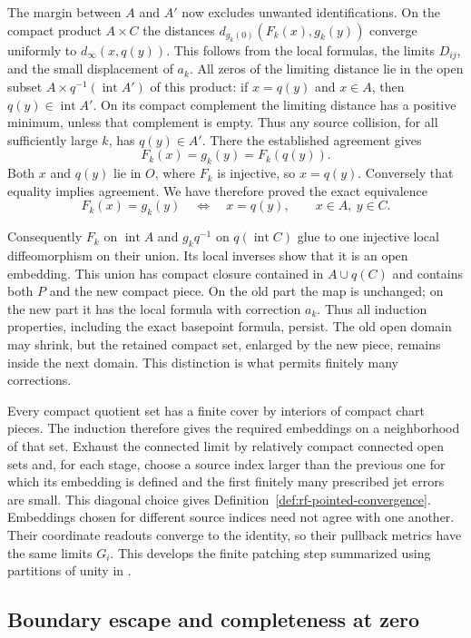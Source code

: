 The margin between $A$ and $A'$ now excludes unwanted identifications.
On the compact product $A\times C$ the distances
$d_{g_k(0)}(F_k(x),g_k(y))$ converge uniformly to
$d_\infty(x,q(y))$.  This follows from the local formulas, the
limits $D_{ij}$, and the small displacement of $a_k$.
All zeros of the limiting distance lie in the open subset
$A\times q^{-1}(\operatorname{int}A')$ of this product:
if $x=q(y)$ and $x\in A$, then $q(y)\in\operatorname{int}A'$.
On its compact complement the limiting distance has a positive
minimum, unless that complement is empty.  Thus any source collision,
for all sufficiently large $k$, has $q(y)\in A'$.  There the
established agreement gives
\[
 F_k(x)=g_k(y)=F_k(q(y)).
\]
Both $x$ and $q(y)$ lie in $O$, where $F_k$ is injective, so
$x=q(y)$.  Conversely that equality implies agreement.  We have
therefore proved the exact equivalence
\[
       F_k(x)=g_k(y)\quad\Longleftrightarrow\quad x=q(y),
       \qquad x\in A,\ y\in C.
\]

Consequently $F_k$ on $\operatorname{int}A$ and $g_kq^{-1}$ on
$q(\operatorname{int}C)$ glue to one injective local diffeomorphism
on their union.  Its local inverses show that it is an open embedding.
This union has compact closure contained in $A\cup q(C)$ and contains
both $P$ and the new compact piece.  On the old part the map is
unchanged; on the new part it has the local formula with correction
$a_k$.  Thus all induction properties, including the exact basepoint
formula, persist.  The old open domain may shrink, but the retained
compact set, enlarged by the new piece, remains inside the next domain.
This distinction is what permits finitely many corrections.

Every compact quotient set has a finite cover by interiors of compact
chart pieces.  The induction therefore gives the required embeddings
on a neighborhood of that set.  Exhaust the connected limit by
relatively compact connected open sets and, for each stage, choose a
source index larger than the previous one for which its embedding is
defined and the first finitely many prescribed jet errors are small.
This diagonal choice gives
Definition~\ref{def:rf-pointed-convergence}.  Embeddings chosen for
different source indices need not agree with one another.  Their
coordinate readouts converge to the identity, so their pullback
metrics have the same limits $G_i$.  This develops the finite patching
step summarized using partitions of unity in
\cite[Theorem 5.6, pp.~86--87]{MT2007}.

\subsection{Boundary escape and completeness at zero}

